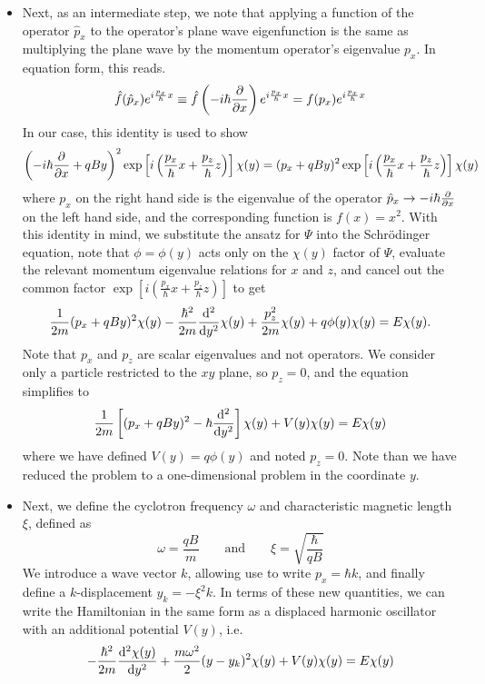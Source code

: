 \documentclass[11pt, a4paper]{article}
\newcommand{\eqtext}[1]{\qquad \text{#1} \qquad}
\newcommand{\Schro}{Schr\"{o}dinger\xspace}
\newcommand{\Ham}{Hamiltonian\xspace}
\renewcommand{\P}{\Psi}  %
\begin{document}
\begin{itemize}
	\item Next, as an intermediate step, we note that applying a function of the operator $ \hat{p}_{x} $ to the operator's plane wave eigenfunction is the same as multiplying the plane wave by the momentum operator's eigenvalue $ p_{x} $. In equation form, this reads. 
	\begin{equation*}
		\hat{f}(\hat{p}_{x})e^{i\frac{p_{x}}{\hbar}x} \equiv  \hat{f}\left(-i\hbar \pdv{x}\right)e^{i\frac{p_{x}}{\hbar}x} = f(p_{x}) e^{i\frac{p_{x}}{\hbar}x} 
	\end{equation*}
	In our case, this identity is used to show
	\begin{align*}
		\left(-i\hbar \pdv{x} + qBy\right)^{2}\exp\left[i \left(\frac{p_{x}}{\hbar}x + \frac{p_{z}}{\hbar}z \right)\right]\chi(y) = (p_{x} + qBy)^{2}\exp\left[i \left(\frac{p_{x}}{\hbar}x + \frac{p_{z}}{\hbar}z \right)\right]\chi(y)
	\end{align*}
	where $ p_{x} $ on the right hand side is the eigenvalue of the operator $ \hat{p}_{x} \to -i\hbar \pdv{x}$ on the left hand side, and the corresponding function is $ f(x) = x^{2} $. With this identity in mind, we substitute the ansatz for $ \P $ into the \Schro equation, note that $ \phi = \phi(y) $ acts only on the $ \chi(y) $ factor of $ \P $, evaluate the relevant momentum eigenvalue relations for $ x $ and $ z $, and cancel out the common factor $ \exp\left[i \left(\frac{p_{x}}{\hbar}x + \frac{p_{z}}{\hbar}z \right)\right] $ to get
	\begin{equation*}
		\frac{1}{2m}(p_{x} + qBy)^{2}\chi(y) - \frac{\hbar^{2}}{2m}\dv[2]{}{y}\chi(y) + \frac{p^{2}_{z}}{2m}\chi(y) + q\phi(y)\chi(y) = E\chi(y).
	\end{equation*}
	Note that $ p_{x} $ and $ p_{z} $ are scalar eigenvalues and not operators. We consider only a particle restricted to the  $ xy $ plane, so $ p_{z} = 0 $, and the equation simplifies to
	\begin{equation*}
		\frac{1}{2m}\left[(p_{x} + qBy)^{2} - \hbar \dv[2]{}{y}\right]\chi(y) + V(y)\chi(y) = E\chi(y)
	\end{equation*}
	where we have defined $ V(y) = q\phi(y) $ and noted $ p_{z} = 0 $. Note than we have reduced the problem to a one-dimensional problem in the coordinate $ y $. 
	
	\item Next, we define the cyclotron frequency $  \omega  $ and characteristic magnetic length $ \xi $, defined as
	\begin{equation*}
		\omega = \frac{qB}{m} \eqtext{and} \xi = \sqrt{\frac{\hbar}{qB}}
	\end{equation*}
	We introduce a wave vector $ k $, allowing use to write $ p_{x} = \hbar k $, and finally define a $ k $-displacement $ y_{k} = -\xi^{2}k $. In terms of these new quantities, we can write the \Ham in the same form as a displaced harmonic oscillator with an additional potential $ V(y) $, i.e.
	\begin{equation*}
		-\frac{\hbar^{2}}{2m} \dv[2]{\chi(y)}{y} + \frac{m\omega^{2}}{2}(y - y_{k})^{2}\chi(y) + V(y)\chi(y) = E\chi(y)
	\end{equation*}
	

\end{itemize}
\end{document}
